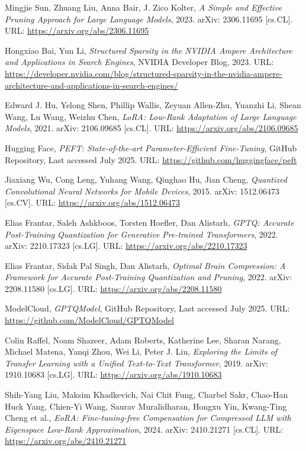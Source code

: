 \begin{thebibliography}{9}
	Mingjie Sun, Zhuang Liu, Anna Bair, J. Zico Kolter,
	\textit{A Simple and Effective Pruning Approach for Large Language Models},
	2023. arXiv: 2306.11695 [cs.CL]. URL: \url{https://arxiv.org/abs/2306.11695}

	Hongxiao Bai, Yun Li,
	\textit{Structured Sparsity in the NVIDIA Ampere Architecture and Applications in Search Engines},
	NVIDIA Developer Blog, 2023. URL: \url{https://developer.nvidia.com/blog/structured-sparsity-in-the-nvidia-ampere-architecture-and-applications-in-search-engines/}

	Edward J. Hu, Yelong Shen, Phillip Wallis, Zeyuan Allen-Zhu, Yuanzhi Li, Shean Wang, Lu Wang, Weizhu Chen,
	\textit{LoRA: Low-Rank Adaptation of Large Language Models},
	2021. arXiv: 2106.09685 [cs.CL]. URL: \url{https://arxiv.org/abs/2106.09685}

	Hugging Face,
	\textit{PEFT: State-of-the-art Parameter-Efficient Fine-Tuning},
	GitHub Repository, Last accessed July 2025. URL: \url{https://github.com/huggingface/peft}

	Jiaxiang Wu, Cong Leng, Yuhang Wang, Qinghao Hu, Jian Cheng,
	\textit{Quantized Convolutional Neural Networks for Mobile Devices},
	2015. arXiv: 1512.06473 [cs.CV]. URL: \url{https://arxiv.org/abs/1512.06473}

	Elias Frantar, Saleh Ashkboos, Torsten Hoefler, Dan Alistarh,
	\textit{GPTQ: Accurate Post-Training Quantization for Generative Pre-trained Transformers},
	2022. arXiv: 2210.17323 [cs.LG]. URL: \url{https://arxiv.org/abs/2210.17323}

	Elias Frantar, Sidak Pal Singh, Dan Alistarh,
	\textit{Optimal Brain Compression: A Framework for Accurate Post-Training Quantization and Pruning},
	2022. arXiv: 2208.11580 [cs.LG]. URL: \url{https://arxiv.org/abs/2208.11580}

	ModelCloud,
	\textit{GPTQModel},
	GitHub Repository, Last accessed July 2025. URL: \url{https://github.com/ModelCloud/GPTQModel}

	Colin Raffel, Noam Shazeer, Adam Roberts, Katherine Lee, Sharan Narang, Michael Matena, Yanqi Zhou, Wei Li, Peter J. Liu,
	\textit{Exploring the Limits of Transfer Learning with a Unified Text-to-Text Transformer},
	2019. arXiv: 1910.10683 [cs.LG]. URL: \url{https://arxiv.org/abs/1910.10683}

	Shih-Yang Liu, Maksim Khadkevich, Nai Chit Fung, Charbel Sakr, Chao-Han Huck Yang, Chien-Yi Wang, Saurav Muralidharan, Hongxu Yin, Kwang-Ting Cheng et al.,
	\textit{EoRA: Fine-tuning-free Compensation for Compressed LLM with Eigenspace Low-Rank Approximation},
	2024. arXiv: 2410.21271 [cs.CL]. URL: \url{https://arxiv.org/abs/2410.21271}


\end{thebibliography}
